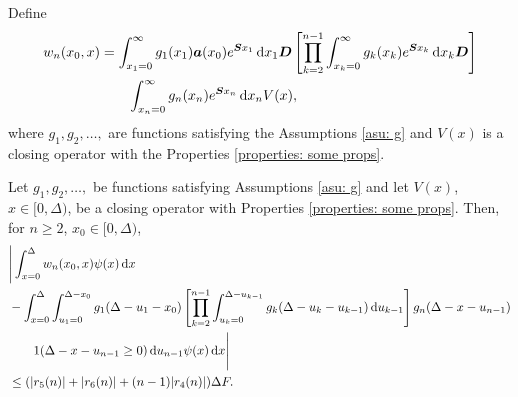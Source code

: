 Define 
\begin{align}
		w_n(x_0,x) &= \int_{x_1=0}^\infty g_1(x_1) \boldsymbol a (x_0) e^{\boldsymbol{S}x_1}\, \mathrm{d} x_1\boldsymbol D 
            	\left[\prod_{k=2}^{n-1}\int_{x_k=0}^\infty g_k(x_k) e^{\boldsymbol{S}x_k} \, \mathrm{d} x_k \boldsymbol D\right] \nonumber
		\\&\qquad{}\int_{x_n=0}^\infty g_{n}(x_n) e^{\boldsymbol{S}x_n} \, \mathrm{d} x_n V(x), \nonumber 
\end{align}
where \(g_1,g_2,\dots,\) are functions satisfying the Assumptions \ref{asu: g} and \(V(x)\) is a closing operator with the Properties \ref{properties: some props}. %

\begin{cor}
	 Let \(g_1,g_2,\dots,\) be functions satisfying Assumptions \ref{asu: g} and let \(V(x)\), \(x\in[0,\Delta)\), be a closing operator with Properties \ref{properties: some props}. Then, for \(n\geq 2\), \(x_0\in[0,\Delta)\), 
	\begin{align}
		&\Bigg| \int_{x=0}^\Delta w_n(x_0,x) \psi(x) \, \mathrm{d} x \nonumber 
		\\&{}- \int_{x=0}^\Delta \int_{u_1=0}^{\Delta-x_0}g_1(\Delta - u_1 - x_0)
		\left[\prod_{k=2}^{n-1} \int_{u_k=0}^{\Delta-u_{k-1}} g_k(\Delta-u_k-u_{k-1})\, \mathrm{d} u_{k-1}\right] \nonumber 
            	g_{n}(\Delta - x-u_{n-1})
	\\&\qquad{} 1(\Delta-x-u_{n-1}\geq0) \, \mathrm{d} u_{n-1}\psi(x) \, \mathrm{d} x \Bigg| \nonumber
		\\&\leq (|r_5(n)| + |r_6(n)| + (n-1)|r_4(n)|)\Delta F. \label{eqn: rhs g 4dvfklsmv}
	\end{align}
\end{cor}
